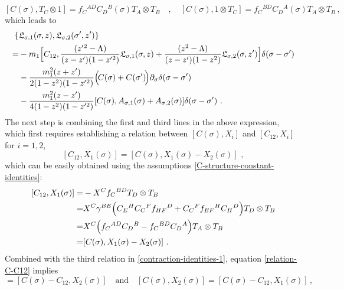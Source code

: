 \documentclass[12pt]{article}
\numberwithin{equation}{section}
\begin{document}
\begin{equation}\label{int-2}
[C(\sigma),T_{C}\otimes \mathrm{1}]=f_{C}{}^{AD}C_{D}{}^{B}(\sigma)T_{A}\otimes T_{B}
\quad , \quad 
[C(\sigma),\mathrm{1}\otimes T_{C}]=f_{C}{}^{BD}C_{D}{}^{A}(\sigma)T_{A}\otimes T_{B} \, ,
\end{equation}
which leads to
\begin{equation}\label{SSSM-Maillet-bracket-intermediate}
\begin{aligned}
\{& \mathfrak{L}_{\sigma,1}(\sigma,z),\mathfrak{L}_{\sigma,2}(\sigma',z') \}
\\
=&-m_{1}\Bigl[C_{12}, \frac{(z'{}^2-\Lambda)}{(z-z')(1-z'{}^2)}\mathfrak{L}_{\sigma,1}(\sigma,z)+\frac{(z^2-\Lambda)}{(z-z')(1-z^2)}\mathfrak{L}_{\sigma,2}(\sigma,z') \Bigr]\delta(\sigma-\sigma')
\\
&-\frac{m_{1}^2(z+z')}{2(1-z^2)(1-z'{}^2)}\Bigl(\! C(\sigma)+C(\sigma') \! \Bigr)\partial_{\sigma}\delta(\sigma-\sigma')
\\
&-\frac{m_{1}^2(z-z')}{4(1-z^2)(1-z'{}^2)}[C(\sigma),A_{\sigma,1}(\sigma)+A_{\sigma,2}(\sigma)]\delta(\sigma-\sigma') \,\, .
\end{aligned}
\end{equation}
The next step is combining the first and third lines in the above expression, which first requires establishing a relation between $[C(\sigma),X_{i}]$ and $[C_{12},X_{i}]$ for $i=1,2$,
\begin{equation}\label{relation-C-C12}
[C_{12},X_{1}(\sigma)]=[C(\sigma),X_{1}(\sigma)-X_{2}(\sigma)] \,\, ,
\end{equation}
which can be easily obtained using the assumptions \eqref{C-structure-constant-identities}:
\begin{equation}
\begin{aligned}
[C_{12},X_{1}(\sigma)]=&-X{}^{C}f_{C}{}^{BD}T_{D}\otimes T_{B}
\\
=&X^{C}\gamma^{BE}\Bigl(C_{E}{}^{H}C_{C}{}^{F}f_{HF}{}^{D}+C_{C}{}^{F}f_{EF}{}^{H}C_{H}{}^{D}\Bigr)T_{D}\otimes T_{B}
\\
=&X^{C}\Bigl( f_{C}{}^{AD}C_{D}{}^{B}-f_{C}{}^{BD}C_{D}{}^{A} \Bigr)T_{A}\otimes T_{B}
\\
=&[C(\sigma),X_{1}(\sigma)-X_{2}(\sigma)] \,\, .
\end{aligned}
\end{equation}
Combined with the third relation in \eqref{contraction-identities-1}, equation \eqref{relation-C-C12} implies 
\begin{equation}
[C(\sigma),X_{1}(\sigma)]=[C(\sigma)-C_{12},X_{2}(\sigma)]
\quad \text{and} \quad 
[C(\sigma),X_{2}(\sigma)]=[C(\sigma)-C_{12},X_{1}(\sigma)] \, ,
\end{equation}
\end{document}
